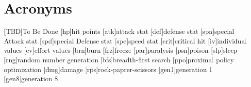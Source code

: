
\chapter*{Acronyms}

\begin{acronym}
	[TBD]{To Be Done}
	[hp]{hit points}
	[atk]{attack stat}
	[def]{defense stat}
	[spa]{special Attack stat}
	[spd]{special Defense stat}
	[spe]{speed stat}
	[crit]{critical hit}
	[iv]{individual values}
	[ev]{effort values}
	[brn]{burn}
	[frz]{freeze}
	[par]{paralysis}
	[psn]{poison}
	[slp]{sleep}
	[rng]{random number generation}
	[bfs]{breadth-first search}
	[ppo]{proximal policy optimization}
	[dmg]{damage}
	[rps]{rock-paprer-scissors}
	[gen1]{generation 1}
	[gen8]{generation 8}
\end{acronym}